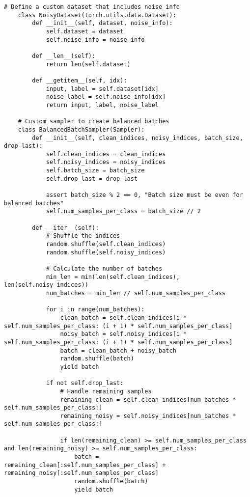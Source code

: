 \begin{lstlisting}[style=pythonstyle, caption={メインコード}]
    # Define a custom dataset that includes noise_info
    class NoisyDataset(torch.utils.data.Dataset):
        def __init__(self, dataset, noise_info):
            self.dataset = dataset
            self.noise_info = noise_info
    
        def __len__(self):
            return len(self.dataset)
    
        def __getitem__(self, idx):
            input, label = self.dataset[idx]
            noise_label = self.noise_info[idx]
            return input, label, noise_label
    
    # Custom sampler to create balanced batches
    class BalancedBatchSampler(Sampler):
        def __init__(self, clean_indices, noisy_indices, batch_size, drop_last):
            self.clean_indices = clean_indices
            self.noisy_indices = noisy_indices
            self.batch_size = batch_size
            self.drop_last = drop_last
    
            assert batch_size % 2 == 0, "Batch size must be even for balanced batches"
            self.num_samples_per_class = batch_size // 2
    
        def __iter__(self):
            # Shuffle the indices
            random.shuffle(self.clean_indices)
            random.shuffle(self.noisy_indices)
    
            # Calculate the number of batches
            min_len = min(len(self.clean_indices), len(self.noisy_indices))
            num_batches = min_len // self.num_samples_per_class
    
            for i in range(num_batches):
                clean_batch = self.clean_indices[i * self.num_samples_per_class: (i + 1) * self.num_samples_per_class]
                noisy_batch = self.noisy_indices[i * self.num_samples_per_class: (i + 1) * self.num_samples_per_class]
                batch = clean_batch + noisy_batch
                random.shuffle(batch)
                yield batch
    
            if not self.drop_last:
                # Handle remaining samples
                remaining_clean = self.clean_indices[num_batches * self.num_samples_per_class:]
                remaining_noisy = self.noisy_indices[num_batches * self.num_samples_per_class:]
    
                if len(remaining_clean) >= self.num_samples_per_class and len(remaining_noisy) >= self.num_samples_per_class:
                    batch = remaining_clean[:self.num_samples_per_class] + remaining_noisy[:self.num_samples_per_class]
                    random.shuffle(batch)
                    yield batch
    

\end{lstlisting}
